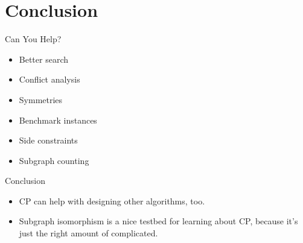 \documentclass{beamer}
\begin{document}
\section{Conclusion}

\begin{frame}{Can You Help?}
    \begin{itemize}
        \item Better search
        \item Conflict analysis
        \item Symmetries
        \item Benchmark instances
        \item Side constraints
        \item Subgraph counting
    \end{itemize}
\end{frame}

\begin{frame}{Conclusion}
    \begin{itemize}
        \item CP can help with designing other algorithms, too.
        \item Subgraph isomorphism is a nice testbed for learning about CP, because it's just the
            right amount of complicated.
    \end{itemize}
\end{frame}
\end{document}
